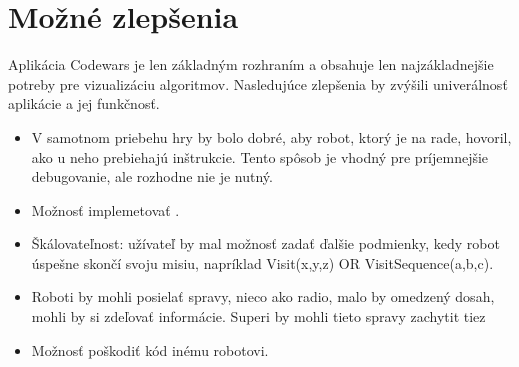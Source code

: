 \section{Možné zlepšenia}
Aplikácia Codewars je len základným rozhraním a obsahuje len najzákladnejšie potreby pre vizualizáciu algoritmov. Nasledujúce zlepšenia by zvýšili univerálnosť aplikácie a jej funkčnosť.\\
\begin{itemize}
\item V samotnom priebehu hry by bolo dobré, aby robot, ktorý je na rade, hovoril, ako u neho prebiehajú inštrukcie. Tento spôsob je vhodný pre príjemnejšie debugovanie, ale rozhodne nie je nutný.
\item Možnosť implemetovať .
\item Škálovateľnost: užívateľ by mal možnosť zadať ďalšie podmienky, kedy robot úspešne skončí svoju misiu, napríklad Visit(x,y,z) OR VisitSequence(a,b,c).
\item Roboti by mohli posielať spravy, nieco ako radio, malo by omedzený dosah, mohli by si zdeľovať informácie. Superi by mohli tieto spravy zachytit tiez
\item Možnosť poškodiť kód inému robotovi.
\end{itemize}
%


%
